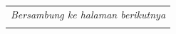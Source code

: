 \begin{longtable}{|m{2cm}|m{3.5cm}|m{4.5cm}|m{4.5cm}|}
    \hline \multicolumn{4}{r}{\textit{Bersambung ke halaman berikutnya}}                                                                                                                                                                                                                                                                                                                                                                                                                                                                                                                                                                                              \\
    \endfoot %

    \hline
    \endlastfoot %


\end{longtable}
